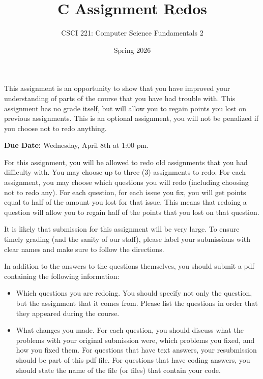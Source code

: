 \documentclass{exam}
\begin{document}
\title{C Assignment Redos}
\author{CSCI 221: Computer Science Fundamentals 2}
\date{Spring 2026}
\maketitle


This assignment is an opportunity to show that you have improved your understanding of parts of the course that you have had trouble with.
This assignment has no grade itself, but will allow you to regain points you lost on previous assignments.
This is an optional assignment, you will not be penalized if you choose not to redo anything.

\textbf{Due Date:}
Wednesday, April 8th at 1:00 pm.

For this assignment, you will be allowed to redo old assignments that you had difficulty with.
You may choose up to three (3) assignments to redo.
For each assignment, you may choose which questions you will redo (including choosing not to redo any).
For each question, for each issue you fix, you will get points equal to half of the amount you lost for that issue.
This means that redoing a question will allow you to regain half of the points that you lost on that question.

It is likely that submission for this assignment will be very large.
To ensure timely grading (and the sanity of our staff), please label your submissions with clear names and make sure to follow the directions.

In addition to the answers to the questions themselves, you should submit a pdf containing the following information:
\begin{itemize}
\item
Which questions you are redoing.
You should specify not only the question, but the assignment that it comes from.
Please list the questions in order that they appeared during the course.

\item
What changes you made.
For each question, you should discuss what the problems with your original submission were, which problems you fixed, and how you fixed them.
For questions that have text answers, your resubmission should be part of this pdf file.
For questions that have coding answers, you should state the name of the file (or files) that contain your code.
\end{itemize}
\end{document}
